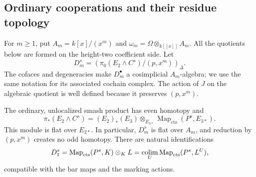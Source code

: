 \subsection{Ordinary cooperations and their residue topology}

For $m\geq1$, put $A_m=k[x]/(x^m)$ and
$\omega_m=\Omega\otimes_{k[[x]]}A_m$.  All the quotients below are
formed on the height-two coefficient side.  Let
\begin{equation}\label{eq:jet-cooperation-definition}
  D_m^s=
  \left(\pi_0(E_2\wedge C^s)/(p,x^m)\right)_\Delta.
\end{equation}
The cofaces and degeneracies make $D_m^\bullet$ a cosimplicial
$A_m$-algebra; we use the same notation for its associated cochain
complex.  The action of $J$ on the algebraic quotient is well defined
because it preserves $(p,x^m)$.

\begin{lemma}
\label{lem:ordinary-cooperations}
The ordinary, unlocalized smash product has even homotopy and
\begin{equation}\label{eq:ordinary-kunneth}
  \pi_*(E_2\wedge C^s)
    =(E_2)_*(E_3)\otimes_{E_{3*}}
          \operatorname{Map}_{\mathrm{cts}}(P^s,E_{3*}).
\end{equation}
This module is flat over $E_{2*}$.  In particular, $D_m^s$ is flat
over $A_m$, and reduction by $(p,x^m)$ creates no odd homotopy.
There are natural identifications
\begin{equation}\label{eq:residue-cochains}
  D_1^s=
  \operatorname{Map}_{\mathrm{cts}}(P^s,K)\otimes_K L
    =\operatorname*{colim}_U\operatorname{Map}_{\mathrm{cts}}(P^s,L^U),
\end{equation}
compatible with the bar maps and the marking actions.
\end{lemma}

